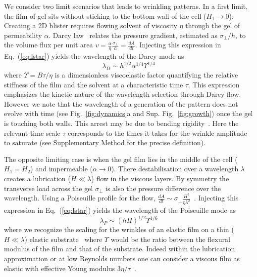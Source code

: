 \documentclass[twocolumn,superscriptaddress,showpacs,preprintnumbers,
amsmath,amssymb,prl]{revtex4-1}
\begin{document}
We consider two limit scenarios that leads to wrinkling patterns. In a first limit, the film of gel sits without sticking to the bottom wall of the cell ($H_1\rightarrow0$). Creating a 2D blister requires flowing solvent of viscosity $\eta$ through the gel of permeability $\alpha$. Darcy law~\cite{Darcy1856} relates the pressure gradient, estimated as $\sigma_{\perp}/h$, to the volume flux per unit area $v = \frac{\alpha}{\eta}\frac{\sigma_{\perp}}{h} = \frac{dA}{dt}$. Injecting this expression in Eq.~(\ref{eq:lstar}) yields the wavelength of the Darcy mode as
\begin{equation}
\lambda_D \sim h^{1/2} \alpha^{1/4} \Upsilon^{1/4}
\end{equation}
where $\Upsilon = B\tau/\eta$ is a dimensionless viscoelastic factor quantifying the relative stiffness of the film and the solvent at a characteristic time $\tau$. This expression emphasizes the kinetic nature of the wavelength selection through Darcy flow. However we note that the wavelength of a generation of the pattern does not evolve with time (see Fig.~\ref{fig:dynamics}a and Sup. Fig.~\ref{fig:growth}) once the gel is touching both walls. This arrest may be due to bending rigidity~\cite{LeGoff2014}. Here the relevant time scale $\tau$ corresponds to the times it takes for the wrinkle amplitude to saturate (see Supplementary Method for the precise definition).

The opposite limiting case is when the gel film lies in the middle of the cell ($H_1=H_2$) and impermeable ($\alpha\rightarrow 0$). There destabilisation over a wavelength $\lambda$ creates a lubrication ($H\ll\lambda$) flow in the viscous layers. By symmetry the transverse load across the gel $\sigma_{\perp}$ is also the pressure difference over the wavelength. Using a Poiseuille profile for the flow, $\frac{dA}{dt} \sim \sigma_{\perp} \frac{H^3}{\eta\lambda^2}$~\cite{Poiseuille1842}. Injecting this expression in Eq.~(\ref{eq:lstar}) yields the wavelength of the Poiseuille mode as
\begin{equation}
\lambda_P \sim (hH)^{1/2} \Upsilon^{1/6}
\end{equation}
where we recognize the scaling for the wrinkles of an elastic film on a thin ($H\ll\lambda$) elastic substrate~\cite{Cerda2003} where $\Upsilon$ would be the ratio between the flexural modulus of the film and that of the substrate. Indeed within the lubrication approximation or at low Reynolds numbers one can consider a viscous film as elastic with effective Young modulus $3\eta/\tau$~\cite{Biot1957,Boudaoud2001}.
\end{document}
